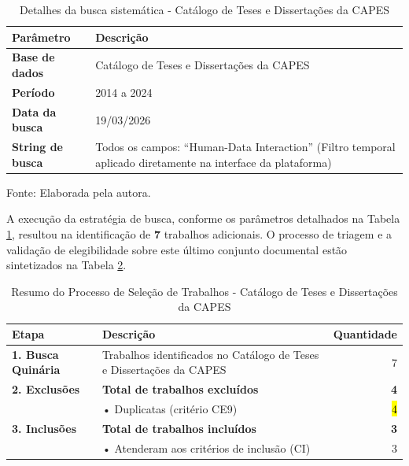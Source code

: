 \documentclass[
	12pt,				%
	oneside,			%
	a4paper,			%
	english,			%
	brazil				%
	]{abntex2ppgsi}
\begin{document}
\begin{table}[htbp]
\centering
\caption{Detalhes da busca sistemática - Catálogo de Teses e Dissertações da CAPES}
\label{tab:detalhes_busca_teses_capes}
\renewcommand{\arraystretch}{1.4} 
\begin{tabular}{@{} >{\bfseries}p{3.5cm} p{11cm} @{}}
\toprule
Parâmetro & Descrição \\
\midrule
Base de dados & Catálogo de Teses e Dissertações da CAPES \\
Período & 2014 a 2024 \\
Data da busca & 19/03/2026 \\
String de busca & Todos os campos: ``Human-Data Interaction'' (Filtro temporal aplicado diretamente na interface da plataforma) \\
\bottomrule
\end{tabular}

\vspace{0.2cm} 
{\small Fonte: Elaborada pela autora.}
\end{table}

A execução da estratégia de busca, conforme os parâmetros detalhados na Tabela \ref{tab:detalhes_busca_teses_capes}, resultou na identificação de \textbf{7} trabalhos adicionais. O processo de triagem e a validação de elegibilidade sobre este último conjunto documental estão sintetizados na Tabela \ref{tab:resumo_selecao_CatalogoTeses_Capes}.

\clearpage

\begin{table}[h]
\centering
\caption{Resumo do Processo de Seleção de Trabalhos - Catálogo de Teses e Dissertações da CAPES}
\label{tab:resumo_selecao_CatalogoTeses_Capes}
\begin{tabularx}{\textwidth}{lXr}
\toprule
\textbf{Etapa} & \textbf{Descrição} & \textbf{Quantidade} \\
\midrule
\textbf{1. Busca Quinária} & Trabalhos identificados no Catálogo de Teses e Dissertações da CAPES & 7 \\
\midrule
\textbf{2. Exclusões} & \textbf{Total de trabalhos excluídos} & \textbf{4} \\
& \hspace{0.5cm}• Duplicatas (critério CE9) & \hl{4} \\
\midrule
\textbf{3. Inclusões} & \textbf{Total de trabalhos incluídos} & \textbf{3} \\
& \hspace{0.5cm}• Atenderam aos critérios de inclusão (CI) & 3 \\
\bottomrule
\end{tabularx}
\end{table}
\end{document}
